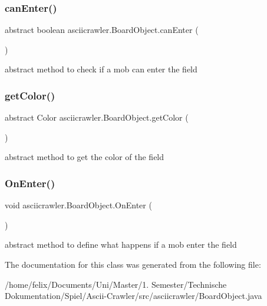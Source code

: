\subsubsection{\texorpdfstring{can\+Enter()}{canEnter()}}
{\footnotesize\ttfamily abstract boolean asciicrawler.\+Board\+Object.\+can\+Enter (\begin{DoxyParamCaption}{ }\end{DoxyParamCaption})\hspace{0.3cm}{\ttfamily [abstract]}}

abstract method to check if a mob can enter the field \mbox{\label{classasciicrawler_1_1BoardObject_a64d367ca58baa54f85c5d266c0d01ca9}} 
\subsubsection{\texorpdfstring{get\+Color()}{getColor()}}
{\footnotesize\ttfamily abstract Color asciicrawler.\+Board\+Object.\+get\+Color (\begin{DoxyParamCaption}{ }\end{DoxyParamCaption})\hspace{0.3cm}{\ttfamily [abstract]}}

abstract method to get the color of the field \mbox{\label{classasciicrawler_1_1BoardObject_aa9f18f80f01310da87221b78cf15de66}} 
\subsubsection{\texorpdfstring{On\+Enter()}{OnEnter()}}
{\footnotesize\ttfamily void asciicrawler.\+Board\+Object.\+On\+Enter (\begin{DoxyParamCaption}{ }\end{DoxyParamCaption})\hspace{0.3cm}{\ttfamily [inline]}}

abstract method to define what happens if a mob enter the field 

The documentation for this class was generated from the following file\+:\begin{DoxyCompactItemize}
\item 
/home/felix/\+Documents/\+Uni/\+Master/1. Semester/\+Technische Dokumentation/\+Spiel/\+Ascii-\/\+Crawler/src/asciicrawler/Board\+Object.\+java\end{DoxyCompactItemize}
